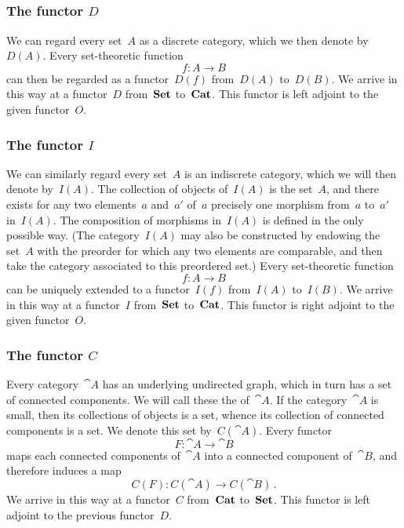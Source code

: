 \subsection{}



\subsubsection*{The functor \texorpdfstring{$D$}{D}}

We can regard every set~$A$ as a discrete category, which we then denote by~$D(A)$.
Every set-theoretic function
\[
	f \colon A \to B
\]
can then be regarded as a functor~$D(f)$ from~$D(A)$ to~$D(B)$.
We arrive in this way at a functor~$D$ from~$\mathbf{Set}$ to~$\mathbf{Cat}$.
This functor is left adjoint to the given functor~$O$.



\subsubsection*{The functor \texorpdfstring{$I$}{I}}

We can similarly regard every set~$A$ is an indiscrete category, which we will then denote by~$I(A)$.
The collection of objects of~$I(A)$ is the set~$A$, and there exists for any two elements~$a$ and~$a'$ of~$a$ precisely one morphism from~$a$ to~$a'$ in~$I(A)$.
The composition of morphisms in~$I(A)$ is defined in the only possible way.
(The category~$I(A)$ may also be constructed by endowing the set~$A$ with the preorder for which any two elements are comparable, and then take the category associated to this preordered set.)
Every set-theoretic function
\[
	f \colon A \to B
\]
can be uniquely extended to a functor~$I(f)$ from~$I(A)$ to~$I(B)$.
We arrive in this way at a functor~$I$ from~$\mathbf{Set}$ to~$\mathbf{Cat}$.
This functor is right adjoint to the given functor~$O$.



\subsubsection*{The functor \texorpdfstring{$C$}{C}}

Every category~$\cat{A}$ has an underlying undirected graph, which in turn has a set of connected components. We will call these the  of~$\cat{A}$.
If the category~$\cat{A}$ is small, then its collections of objects is a set, whence its collection of connected components is a set.
We denote this set by~$C(\cat{A})$.
Every functor
\[
	F \colon \cat{A} \to \cat{B}
\]
maps each connected components of~$\cat{A}$ into a connected component of~$\cat{B}$, and therefore induces a map
\[
	C(F) \colon C(\cat{A}) \to C(\cat{B}) \,.
\]
We arrive in this way at a functor~$C$ from~$\mathbf{Cat}$ to~$\mathbf{Set}$.
This functor is left adjoint to the previous functor~$D$.
